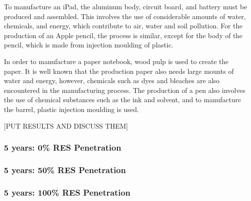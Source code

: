To manufacture an iPad, the aluminum body, circuit board, and battery must be produced and assembled. This involves the use of considerable amounts of water, chemicals, and energy, which contribute to air, water and soil pollution. For the production of an Apple pencil, the process is similar, except for the body of the pencil, which is made from injection moulding of plastic. 

In order to manufacture a paper notebook, wood pulp is used to create the paper. It is well known that the production paper also needs large mounts of water and energy, however, chemicals such as dyes and bleaches are also encountered in the manufacturing process. The production of a pen also involves the use of chemical substances such as the ink and solvent, and to manufacture the barrel, plastic injection moulding is used. 

[PUT RESULTS AND DISCUSS THEM]

\subsubsection*{5 years: 0\% RES Penetration}

\subsubsection*{5 years: 50\% RES Penetration}

\subsubsection*{5 years: 100\% RES Penetration}
